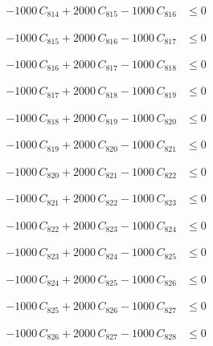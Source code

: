 \documentclass[a4paper,11pt]{article}
\begin{document}
\begin{align}
-1000\,C_{814} + 2000\,C_{815} - 1000\,C_{816} &\leq 0 \nonumber
\end{align}

\begin{align}
-1000\,C_{815} + 2000\,C_{816} - 1000\,C_{817} &\leq 0 \nonumber
\end{align}

\begin{align}
-1000\,C_{816} + 2000\,C_{817} - 1000\,C_{818} &\leq 0 \nonumber
\end{align}

\begin{align}
-1000\,C_{817} + 2000\,C_{818} - 1000\,C_{819} &\leq 0 \nonumber
\end{align}

\begin{align}
-1000\,C_{818} + 2000\,C_{819} - 1000\,C_{820} &\leq 0 \nonumber
\end{align}

\begin{align}
-1000\,C_{819} + 2000\,C_{820} - 1000\,C_{821} &\leq 0 \nonumber
\end{align}

\begin{align}
-1000\,C_{820} + 2000\,C_{821} - 1000\,C_{822} &\leq 0 \nonumber
\end{align}

\begin{align}
-1000\,C_{821} + 2000\,C_{822} - 1000\,C_{823} &\leq 0 \nonumber
\end{align}

\begin{align}
-1000\,C_{822} + 2000\,C_{823} - 1000\,C_{824} &\leq 0 \nonumber
\end{align}

\begin{align}
-1000\,C_{823} + 2000\,C_{824} - 1000\,C_{825} &\leq 0 \nonumber
\end{align}

\begin{align}
-1000\,C_{824} + 2000\,C_{825} - 1000\,C_{826} &\leq 0 \nonumber
\end{align}

\begin{align}
-1000\,C_{825} + 2000\,C_{826} - 1000\,C_{827} &\leq 0 \nonumber
\end{align}

\begin{align}
-1000\,C_{826} + 2000\,C_{827} - 1000\,C_{828} &\leq 0 \nonumber
\end{align}
\end{document}
